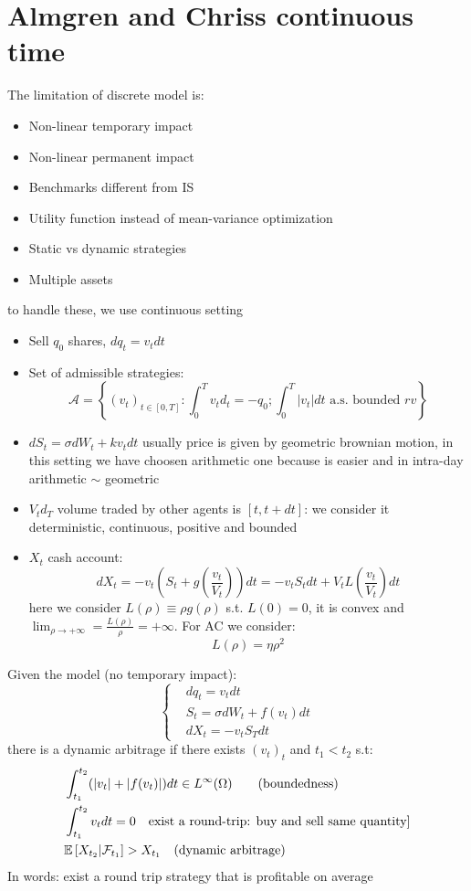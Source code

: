 \section{Almgren and Chriss continuous time}
The limitation of discrete model is:
\begin{itemize}
	\item Non-linear temporary impact
	\item Non-linear permanent impact
	\item Benchmarks different from IS
	\item Utility function instead of mean-variance optimization
	\item Static vs dynamic strategies
	\item Multiple assets
\end{itemize}
to handle these, we use continuous setting
\newpage
\begin{mysetting}
	\begin{itemize}
		\item Sell $q_0$ shares, $dq_t = v_tdt$
		\item Set of admissible strategies:
		\[
		\mathcal{A} = \left\{ (v_t)_{t \in [0,T]}: \int_{0}^{T}v_td_t = -q_0 ; \int_{0}^{T}|v_t|dt \text{ a.s. bounded }rv \right\}
		\]
		\item $dS_t = \sigma dW_t + kv_tdt$
		usually price is given by geometric brownian motion, in this setting we have choosen arithmetic one because is easier and in intra-day arithmetic $\sim$ geometric
		\item $V_td_T$ volume traded by other agents is $[t,t+dt]$: we consider it deterministic, continuous, positive and bounded
		\item $X_t$ cash account:
		\[
		dX_t = -v_t \left(S_t + g\left(\frac{v_t}{V_t}\right)\right)dt = -v_tS_tdt + V_t L\left(\frac{v_t}{V_t}\right)dt
		\]
		here we consider $L(\rho) \equiv \rho g(\rho)$ s.t. $L(0) =0$, it is convex and $\lim_{\rho \to + \infty} = \frac{L(\rho)}{\rho} = +\infty$. For AC we consider:
		\[
		L(\rho) = \eta \rho^2
		\]
	\end{itemize}
\end{mysetting}
\begin{mytheorem}
	Given the model (no temporary impact):
	\[
	\begin{cases}
		& dq_t = v_t dt\\
		& S_t = \sigma dW_t + f(v_t)dt\\
		& dX_t = -v_tS_Tdt
	\end{cases}
	\]
	there is a dynamic arbitrage if there exists $(v_t)_t$ and $t_1<t_2$ s.t:
	\begin{align}
		&\int_{t_1}^{t_2} (|v_t| + |f(v_t)|)dt \in L^{\infty} (\Omega) \qquad (\text{boundedness})\\
		&\int_{t_1}^{t_2}v_tdt = 0 \quad \text{exist a round-trip: buy and sell same quantity]}\\
		&\mathbb{E}\left[X_{t_2}|\mathcal{F}_{t_1}\right]>X_{t_1} \quad (\text{dynamic arbitrage})
	\end{align}
In words: exist a round trip strategy that is profitable on average
\end{mytheorem}
